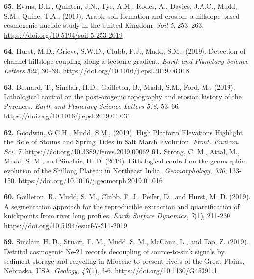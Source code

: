 \documentclass[10pt, a4paper]{article}
\newcommand{\years}[1]{\marginnote{\scriptsize #1}}
\begin{document}
\years{2019}\hangindent=0.7cm\textbf{65. }Evans, D.L., Quinton, J.N., Tye, A.M., Rodes, A., Davies, J.A.C., Mudd, S.M., Quine, T.A., (2019). Arable soil formation and erosion: a hillslope-based cosmogenic nuclide study in the United Kingdom. \textit{Soil} \textit{5}, 253–263. \href{https://doi.org/10.5194/soil-5-253-2019}{https://doi.org/10.5194/soil-5-253-2019}\par
\years{2019}\hangindent=0.7cm\textbf{64. }Hurst, M.D., Grieve, S.W.D., Clubb, F.J., Mudd, S.M., (2019). Detection of channel-hillslope coupling along a tectonic gradient. \textit{Earth and Planetary Science Letters} \textit{522}, 30–39. \href{https://doi.org/10.1016/j.epsl.2019.06.018}{https://doi.org/10.1016/j.epsl.2019.06.018}\par
\years{2019}\hangindent=0.7cm\textbf{63. }Bernard, T., Sinclair, H.D., Gailleton, B., Mudd, S.M., Ford, M., (2019). Lithological control on the post-orogenic topography and erosion history of the Pyrenees. \textit{Earth and Planetary Science Letters} \textit{518}, 53–66. \href{https://doi.org/10.1016/j.epsl.2019.04.034}{https://doi.org/10.1016/j.epsl.2019.04.034}\par
\years{2019}\hangindent=0.7cm\textbf{62. }Goodwin, G.C.H., Mudd, S.M., (2019). High Platform Elevations Highlight the Role of Storms and Spring Tides in Salt Marsh Evolution. \textit{Front. Environ. Sci.} \textit{7}. \href{https://doi.org/10.3389/fenvs.2019.00062}{https://doi.org/10.3389/fenvs.2019.00062}
\years{2019}\hangindent=0.7cm\textbf{61. }Strong, C. M., Attal, M., Mudd, S. M., and Sinclair, H. D. (2019). Lithological control on the geomorphic evolution of the Shillong Plateau in Northeast India. \textit{Geomorphology}, \textit{330}, 133-150. \href{https://doi.org/10.1016/j.geomorph.2019.01.016}{https://doi.org/10.1016/j.geomorph.2019.01.016}\par
\years{2019}\hangindent=0.7cm\textbf{60. }Gailleton, B., Mudd, S. M., Clubb, F. J., Peifer, D., and Hurst, M. D. (2019). A segmentation approach for the reproducible extraction and quantification of knickpoints from river long profiles. \textit{Earth Surface Dynamics}, \textit{7}(1), 211-230. \href{https://doi.org/10.5194/esurf-7-211-2019}{https://doi.org/10.5194/esurf-7-211-2019}\par
\years{2019}\hangindent=0.7cm\textbf{59. }Sinclair, H. D., Stuart, F. M., Mudd, S. M., McCann, L., and Tao, Z. (2019). Detrital cosmogenic Ne-21 records decoupling of source-to-sink signals by sediment storage and recycling in Miocene to present rivers of the Great Plains, Nebraska, USA. \textit{Geology}, \textit{47}(1), 3-6. \href{https://doi.org/10.1130/G45391.1}{https://doi.org/10.1130/G45391.1}\par
\end{document}
